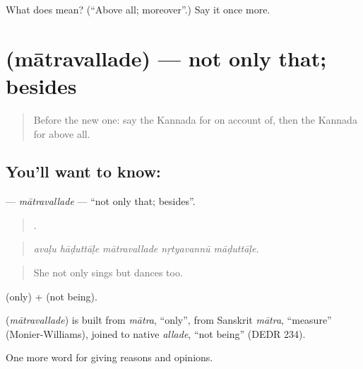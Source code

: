 \begin{tcolorbox}[breakable,colback=teal!4,colframe=teal!35!black,title={Before you move on}]
What does  mean? (\textquotedblleft{}Above all; moreover\textquotedblright{}.) Say it once more.
\end{tcolorbox}
\section[\texorpdfstring{\kn{ಮಾತ್ರವಲ್ಲದೆ} (mātravallade)}{ಮಾತ್ರವಲ್ಲದೆ (mātravallade)}]{ (mātravallade) — not only that; besides}

\label{lesson:KA-C410-matravallade}



\begin{quote}
Before the new one: say the Kannada for on account of, then the Kannada for above all.
\end{quote}

\subsection*{You'll want to know: }
\textbf{} — \emph{mātravallade} — \textquotedblleft{}not only that; besides\textquotedblright{}.

\begin{quote}
    .
\end{quote}

\begin{quote}
\emph{avaḷu hāḍuttāḷe mātravallade nṛtyavannū māḍuttāḷe.}
\end{quote}

\begin{quote}
She not only sings but dances too.
\end{quote}

 (only) +  (not being).

\begin{cousinweb}
\textbf{} (\emph{mātravallade}) is built from \emph{mātra}, \textquotedblleft{}only\textquotedblright{}, from Sanskrit \emph{mātra}, \textquotedblleft{}measure\textquotedblright{} (Monier-Williams), joined to native \emph{allade}, \textquotedblleft{}not being\textquotedblright{} (DEDR 234).
\end{cousinweb}

\begin{grammarlens}[title={What you've built}]
One more word for giving reasons and opinions.
\end{grammarlens}

